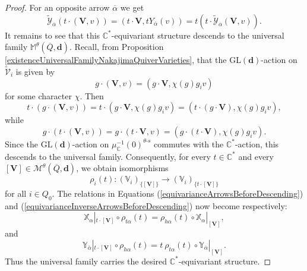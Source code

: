 \documentclass{amsart}
\theoremstyle{plain}
\numberwithin{equation}{section}
\theoremstyle{definition}
\theoremstyle{remark}
\begin{document}
\begin{proof}
		For an opposite arrow $\overline{\alpha}$ we get
		\begin{equation}\label{equivarianceInverseArrowsBeforeDescending}
			\widetilde{\mathcal{Y}}_{\overline\alpha}(t\cdot(\mathbf{V},v))= (t\cdot \mathbf{V},tY_{\overline{\alpha}}(v))
			=t(t\cdot\widetilde{\mathcal{Y}}_{\overline{\alpha}}(\mathbf{V},v)).
		\end{equation}
		It remains to see that this \(\mathbb C^*\)-equivariant structure descends
		to the universal family $\mathbb{M}^{\theta}(\overline{Q},\mathbf{d})$. Recall, from Proposition \ref{existenceUniversalFamilyNakajimaQuiverVarieties}, that the $\text{GL}(\mathbf{d})$-action on $\widetilde{\mathcal{V}}_i$ is given by
		$$
		g\cdot(\mathbf{V},v)=(g\cdot \mathbf{V},\chi(g)g_i v)
		$$
		for some character $\chi$. Then
		$$
		t\cdot(g\cdot(\mathbf{V},v))=t\cdot(g\cdot \mathbf{V},\chi(g)g_i v)=
		(t\cdot(g\cdot \mathbf{V}),\chi(g)g_i v),
		$$
		while
		$$
		g\cdot(t\cdot(\mathbf{V},v))=
		g\cdot(t\cdot \mathbf{V},v)=
		(g\cdot(t\cdot \mathbf{V}),\chi(g)g_i v).
		$$
		Since the $\text{GL}(\mathbf{d})$-action on $\mu^{-1}_{\mathbb{C}}(0)^{\theta\text{-}s}$ commutes with the
		$\mathbb C^*$-action, this descends to the universal family. 
		Consequently, for every $t\in\mathbb{C}^*$ and every
		$[\mathbf{V}]\in \mathcal{M}^{\theta}(\overline{Q},\mathbf{d})$, we obtain isomorphisms
		$$
		\rho_i(t):
		(\mathbb{V}_i)_{\{[\mathbf{V}]\}}
		\to
		(\mathbb{V}_i)_{\{t\cdot[\mathbf{V}]\}}
		$$
		for all $i\in Q_0$. The relations in Equations (\ref{equivarianceArrowsBeforeDescending}) and (\ref{equivarianceInverseArrowsBeforeDescending}) now become respectively:
		$$
		\mathbb{X}_{\alpha}|_{t\cdot[\mathbf{V}]}
		\circ \rho_{t\alpha}(t)=\rho_{h\alpha}(t)\circ \mathbb{X}_{\alpha}|_{[\mathbf{V}]},
		$$
		and
		$$
		\mathbb{Y}_{\overline\alpha}|_{t\cdot[\mathbf{V}]}
		\circ \rho_{h\alpha}(t)=
		t\ 
		\rho_{t\alpha}(t)
		\circ \mathbb{Y}_{\overline\alpha}|_{[\mathbf{V}]}.
		$$
		Thus the universal family carries the desired
		\(\mathbb C^*\)-equivariant structure.
	\end{proof}
\end{document}
